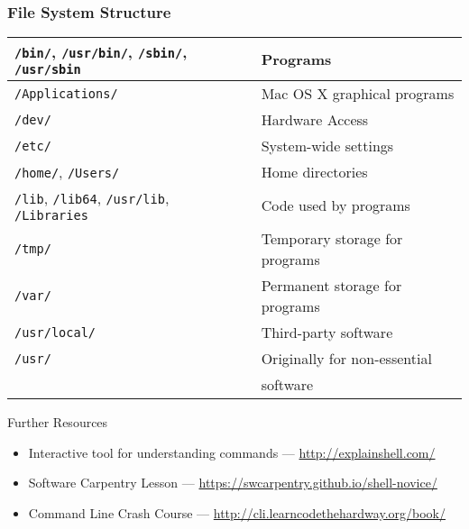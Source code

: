 \documentclass[xcolor={usenames,x11names}]{beamer}
\begin{document}
\begin{frame}[fragile]
\frametitle{File System Structure}
	\begin{tabular}{@{}ll@{}}
		\pause\verb|/bin/|, \verb|/usr/bin/|, \verb|/sbin/|, \verb|/usr/sbin| & Programs\\
		\midrule
		\pause\verb|/Applications/| & Mac OS X graphical programs\\
		\midrule
		\pause\verb|/dev/| & Hardware Access\\
		\midrule
		\pause\verb|/etc/| & System-wide settings\\
		\midrule
		\pause\verb|/home/|, \verb|/Users/| & Home directories\\
		\midrule
		\pause\verb|/lib|, \verb|/lib64|, \verb|/usr/lib|, \verb|/Libraries| & Code used by programs\\
		\midrule
		\pause\verb|/tmp/| & Temporary storage for programs\\
		\midrule
		\pause\verb|/var/| & Permanent storage for programs\\
		\midrule
		\pause\verb|/usr/local/| & Third-party software\\
		\midrule
		\pause\verb|/usr/| & Originally for non-essential\\
		&software\\
		\bottomrule
	\end{tabular}
\end{frame}

\begin{frame}{Further Resources}
 \begin{itemize}
  \item Interactive tool for understanding commands --- \url{http://explainshell.com/}
  \item Software Carpentry Lesson --- \url{https://swcarpentry.github.io/shell-novice/}
  \item Command Line Crash Course --- \url{http://cli.learncodethehardway.org/book/}
 \end{itemize}
\end{frame}
 
\end{document}
